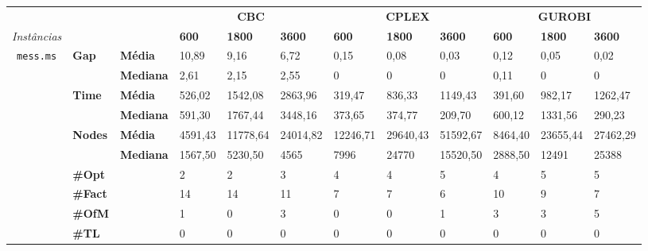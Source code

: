 
	\begin{footnotesize}	
	\caption{}
	\label{cflp:tab:6}
	\begin{tabular}{c@{\hskip 0.2cm}l@{\hskip 0.1cm}l|lll|lll|lll}
	& & & \multicolumn{3}{c}{\textbf{CBC}} & \multicolumn{3}{c}{\textbf{CPLEX}} & \multicolumn{3}{c}{\textbf{GUROBI}} 	\\\textit{Instâncias} & & & \textbf{600} & \textbf{1800} & \textbf{3600} & \textbf{600} & \textbf{1800} & \textbf{3600} & \textbf{600} & \textbf{1800} & \textbf{3600} \\
\hline
\multirow{7}{*}{\texttt{mess.ms}} & \multirow{2}{*}{\textbf{Gap}} & \textbf{Média} & 10,89 & 9,16 & 6,72 & 0,15 & 0,08 & 0,03 & 0,12 & 0,05 & 0,02 \\
 & & \textbf{Mediana} & 2,61 & 2,15 & 2,55 & 0 & 0 & 0 & 0,11 & 0 & 0 \\
\cline{2-12}
 & \multirow{2}{*}{\textbf{Time}} & \textbf{Média} & 526,02 & 1542,08 & 2863,96 & 319,47 & 836,33 & 1149,43 & 391,60 & 982,17 & 1262,47 \\
 & & \textbf{Mediana} & 591,30 & 1767,44 & 3448,16 & 373,65 & 374,77 & 209,70 & 600,12 & 1331,56 & 290,23 \\
\cline{2-12}
 & \multirow{2}{*}{\textbf{Nodes}} & \textbf{Média} & 4591,43 & 11778,64 & 24014,82 & 12246,71 & 29640,43 & 51592,67 & 8464,40 & 23655,44 & 27462,29 \\
 & & \textbf{Mediana} & 1567,50 & 5230,50 & 4565 & 7996 & 24770 & 15520,50 & 2888,50 & 12491 & 25388 \\
\cline{2-12}
 & \textbf{\#Opt} & & 2 & 2 & 3 & 4 & 4 & 5 & 4 & 5 & 5 \\
 & \textbf{\#Fact} & & 14 & 14 & 11 & 7 & 7 & 6 & 10 & 9 & 7 \\
 & \textbf{\#OfM} & & 1 & 0 & 3 & 0 & 0 & 1 & 3 & 3 & 5 \\
 & \textbf{\#TL} & & 0 & 0 & 0 & 0 & 0 & 0 & 0 & 0 & 0 \\
	\end{tabular}
	\end{footnotesize}

